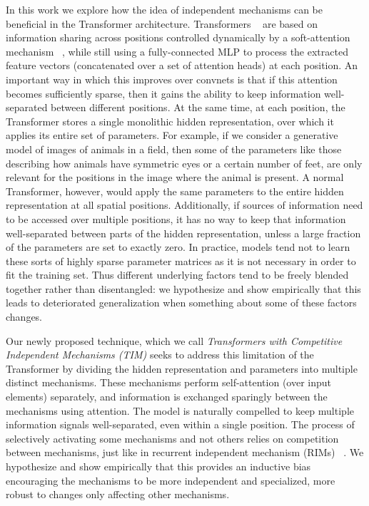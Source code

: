 \documentclass{article}
\begin{document}
In this work we explore how the idea of independent mechanisms can be beneficial in the Transformer architecture.  Transformers ~\citep{vaswani2017attention} are based
on information sharing across positions controlled dynamically by a soft-attention mechanism ~\citep{bahdanau2014neural}, while still using a fully-connected MLP to process the
extracted feature vectors (concatenated over a set of attention heads)
at each position. An important way in which this improves over convnets is that if this attention becomes sufficiently sparse, then it gains the ability to keep information well-separated between different positions.  At the same time, at each position, the Transformer stores a single monolithic hidden representation, over which it applies its entire set of parameters.  For example, if we consider a generative model of images of animals in a field, then some of the parameters like those describing how animals have symmetric eyes or a certain number of feet, are only relevant for the positions in the image where the animal is present.  A normal Transformer, however, would apply the same parameters to the entire hidden representation at all spatial positions.  Additionally, if sources of information need to be accessed over multiple positions, it has no way to keep that information well-separated between parts of the hidden  representation, unless a large fraction of the parameters are set to exactly zero.  In practice, models tend not to learn these sorts of highly sparse parameter matrices as it is not necessary in order to fit the training set. Thus different underlying factors tend to be freely blended together
rather than disentangled: we hypothesize and show empirically that this leads to deteriorated generalization when something about some of these factors changes.  

Our newly proposed technique, which we call \emph{Transformers with Competitive Independent Mechanisms (TIM)} seeks to address this limitation of the Transformer by dividing the hidden representation and parameters into multiple distinct mechanisms.  These mechanisms perform self-attention (over input elements) separately, and information is exchanged sparingly between the mechanisms using attention.  The model is naturally compelled to keep multiple information signals well-separated, even within a single position.  The process of selectively activating some mechanisms and not others relies on competition between
mechanisms, just like in recurrent independent mechanism (RIMs) ~\citep{goyal2019recurrent}. We hypothesize and show empirically that this provides an inductive bias encouraging the mechanisms to be more independent and specialized, more robust to changes only affecting other mechanisms.
\end{document}
